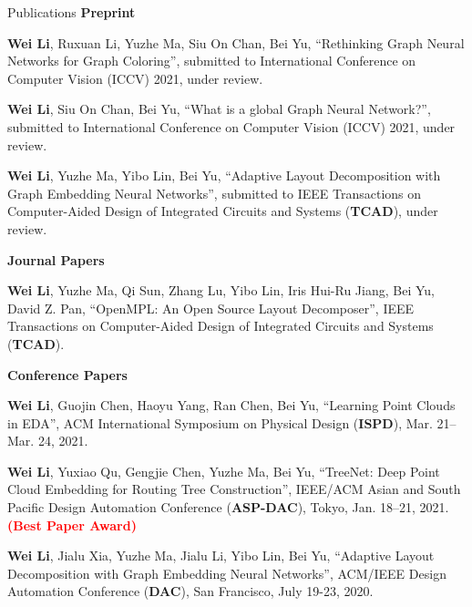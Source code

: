 \begin{rSection}{Publications}
    \textbf{Preprint}
    \begin{description}[font=\normalfont]
        \item[{[C10]}]{
            \textbf{Wei Li}, Ruxuan Li, Yuzhe Ma, Siu On Chan, Bei Yu,
            ``Rethinking Graph Neural Networks for Graph Coloring'', submitted to International Conference on Computer Vision (ICCV) 2021, under review.
        }
        \item[{[C10]}]{
            \textbf{Wei Li}, Siu On Chan, Bei Yu,
            ``What is a global Graph Neural Network?'', submitted to International Conference on Computer Vision (ICCV) 2021, under review.
        }
        \item[{[J2]}]{
            \textbf{Wei Li}, Yuzhe Ma, Yibo Lin, Bei Yu, 
            ``Adaptive Layout Decomposition with Graph Embedding Neural Networks'', submitted to IEEE Transactions on Computer-Aided Design of Integrated Circuits and Systems (\textbf{TCAD}), under review.
        }
    \end{description}
    \textbf{Journal Papers}
    \begin{description}[font=\normalfont]
        \item[{[J1]}]{
            \textbf{Wei Li}, Yuzhe Ma, Qi Sun, Zhang Lu, Yibo Lin, Iris Hui-Ru Jiang, Bei Yu, David Z. Pan,
            ``OpenMPL: An Open Source Layout Decomposer'', IEEE Transactions on Computer-Aided Design of Integrated Circuits and Systems (\textbf{TCAD}).
        }
    \end{description}
\textbf{Conference Papers}
\begin{description}[font=\normalfont]
\item[{[C9]}]{
    \textbf{Wei Li}, Guojin Chen, Haoyu Yang, Ran Chen, Bei Yu,
    ``Learning Point Clouds in EDA'', 
    ACM International Symposium on Physical Design (\textbf{ISPD}), Mar. 21–Mar. 24, 2021.
}
\item[{[C8]}]{
    \textbf{Wei Li}, Yuxiao Qu, Gengjie Chen, Yuzhe Ma, Bei Yu,
    ``TreeNet: Deep Point Cloud Embedding for Routing Tree Construction'', 
    IEEE/ACM Asian and South Pacific Design Automation Conference (\textbf{ASP-DAC}), Tokyo, Jan. 18–21, 2021. \textcolor{red}{\textbf{(Best Paper Award)}}
}
\item[{[C7]}]{
    \textbf{Wei Li}, Jialu Xia, Yuzhe Ma, Jialu Li, Yibo Lin, Bei Yu, 
    ``Adaptive Layout Decomposition with Graph Embedding Neural Networks'', 
    ACM/IEEE Design Automation Conference (\textbf{DAC}), San Francisco, July 19-23, 2020.
}
\end{description}
\end{rSection}
